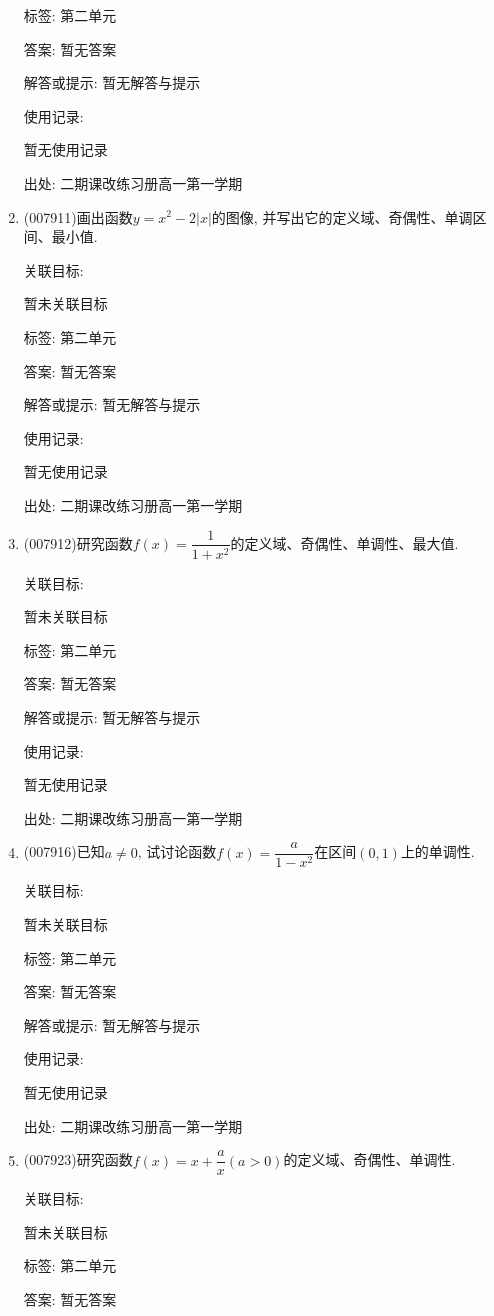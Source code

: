 \documentclass[10pt,a4paper]{article}
\begin{document}
\begin{enumerate}[1.]
标签: 第二单元

答案: 暂无答案

解答或提示: 暂无解答与提示

使用记录:

暂无使用记录


出处: 二期课改练习册高一第一学期
\item { (007911)}画出函数$y=x^2-2|x|$的图像, 并写出它的定义域、奇偶性、单调区间、最小值.


关联目标:

暂未关联目标



标签: 第二单元

答案: 暂无答案

解答或提示: 暂无解答与提示

使用记录:

暂无使用记录


出处: 二期课改练习册高一第一学期
\item { (007912)}研究函数$f(x)=\dfrac 1{1+x^2}$的定义域、奇偶性、单调性、最大值.


关联目标:

暂未关联目标



标签: 第二单元

答案: 暂无答案

解答或提示: 暂无解答与提示

使用记录:

暂无使用记录


出处: 二期课改练习册高一第一学期
\item { (007916)}已知$a\ne 0$, 试讨论函数$f(x)=\dfrac a{1-x^2}$在区间$(0,1)$上的单调性.


关联目标:

暂未关联目标



标签: 第二单元

答案: 暂无答案

解答或提示: 暂无解答与提示

使用记录:

暂无使用记录


出处: 二期课改练习册高一第一学期
\item { (007923)}研究函数$f(x)=x+\dfrac ax(a>0)$的定义域、奇偶性、单调性.


关联目标:

暂未关联目标



标签: 第二单元

答案: 暂无答案


\end{enumerate}
\end{document}
